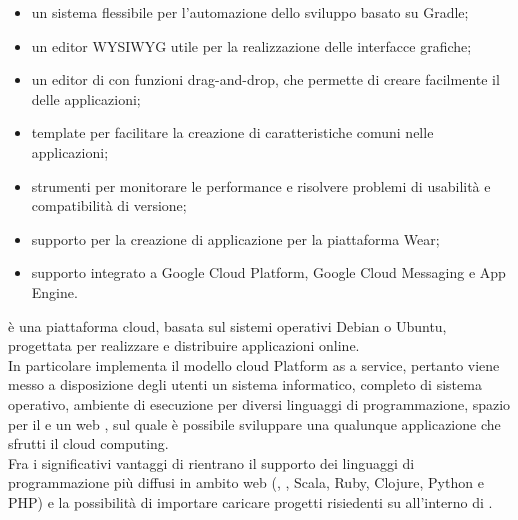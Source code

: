 		\begin{itemize}
			\item un sistema flessibile per l'automazione dello sviluppo basato su Gradle;
			\item un editor WYSIWYG utile per la realizzazione delle interfacce grafiche;
			\item un editor di  con funzioni drag-and-drop, che permette di creare facilmente il  delle applicazioni;
			\item template per facilitare la creazione di caratteristiche comuni nelle applicazioni;
			\item strumenti per monitorare le performance e risolvere problemi di usabilità e compatibilità di versione;
			\item supporto per la creazione di applicazione per la piattaforma  Wear;
			\item supporto integrato a Google Cloud Platform, Google Cloud Messaging e App Engine.
		\end{itemize}
		 è una piattaforma cloud, basata sul sistemi operativi Debian o Ubuntu, progettata per realizzare e distribuire applicazioni online. \\
		In particolare  implementa il modello cloud Platform as a service, pertanto viene messo a disposizione degli utenti un sistema informatico, completo di sistema operativo, ambiente di esecuzione per diversi linguaggi di programmazione, spazio per il  e un web , sul quale è possibile sviluppare una qualunque applicazione che sfrutti il cloud computing.\\
		Fra i significativi vantaggi di  rientrano il supporto dei linguaggi di programmazione più diffusi in ambito web (, , Scala, Ruby, Clojure, Python e PHP) e la possibilità di importare caricare progetti risiedenti su  all'interno di .
	
